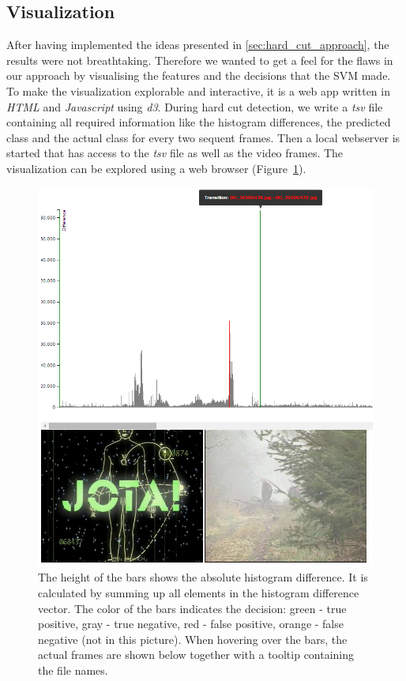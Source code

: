 \subsection{Visualization}
\label{sec:hard_cut_visualization}

After having implemented the ideas presented in \ref{sec:hard_cut_approach}, the results were not breathtaking. 
Therefore we wanted to get a feel for the flaws in our approach by visualising the features and the decisions that the SVM made.
To make the visualization explorable and interactive, it is a web app written in \emph{HTML} and \emph{Javascript} using \emph{d3}.
During hard cut detection, we write a \emph{tsv} file containing all required information like the histogram differences, the predicted class and the actual class for every two sequent frames.
Then a local webserver is started that has access to the \emph{tsv} file as well as the video frames.
The visualization can be explored using a web browser (Figure~\ref{fig:hard_cut_visualization}).

\begin{figure}
	\centering
	\includegraphics[scale=.7]{images/hard_cut_visualization.png}
	\caption{The height of the bars shows the absolute histogram difference. It is calculated by summing up all elements in the histogram difference vector. The color of the bars indicates the decision: green - true positive, gray - true negative, red - false positive, orange - false negative (not in this picture). When hovering over the bars, the actual frames are shown below together with a tooltip containing the file names.}
	\label{fig:hard_cut_visualization}
\end{figure}


